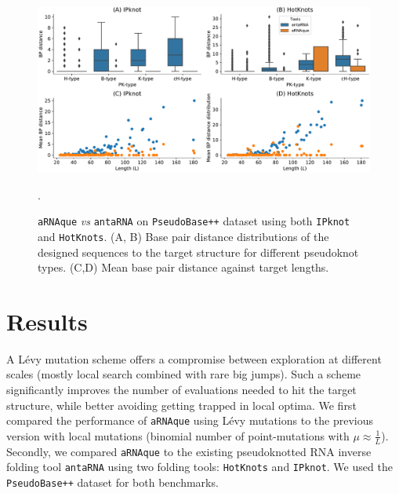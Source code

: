 \begin{figure}[t!]
	\centering
	\includegraphics[width=1.0\linewidth]{../res/images/arnaque/pk_hotknot_IPknot_aRNAqueVSantaRNA_2.pdf}
	\caption{\texttt{aRNAque} \emph{vs} \texttt{antaRNA} on \texttt{PseudoBase++} dataset using both  \texttt{IPknot} and \texttt{HotKnots}. (A, B) Base pair distance distributions of the designed sequences to the target structure for different pseudoknot types. (C,D) Mean base pair distance against target lengths. }\label{Fig:antaRNA_vs_aRNAque}
	\medskip
	\small.
\end{figure}

\section*{Results}
A Lévy mutation scheme offers a compromise between exploration at different scales (mostly local search combined with rare big jumps). Such a scheme significantly improves the number of evaluations needed to hit the target structure, while better avoiding getting trapped in local optima. We first compared the performance of \texttt{aRNAque} using Lévy mutations to the previous version with local mutations (binomial number of point-mutations with $\mu \approx \frac{1}{L}$). Secondly, we compared \texttt{aRNAque} to the existing pseudoknotted RNA inverse folding tool \texttt{antaRNA} using two folding tools: \texttt{HotKnots} and \texttt{IPknot}. We used the \texttt{PseudoBase++} dataset for both benchmarks. 


